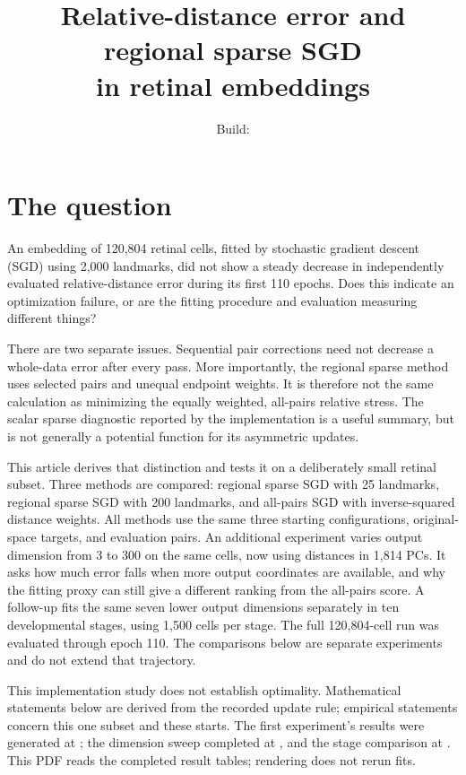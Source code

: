 \documentclass[11pt]{article}
\title{Relative-distance error and regional sparse SGD\\
in retinal embeddings}
\author{}
\date{Build: \reportbuilddatetime}
\begin{document}
\maketitle

\section{The question}
An embedding of 120,804 retinal cells, fitted by stochastic gradient descent
(SGD) using 2,000 landmarks, did not show a steady decrease in independently
evaluated relative-distance error during its first 110 epochs. Does this
indicate an optimization failure, or are the fitting procedure and evaluation
measuring different things?

There are two separate issues. Sequential pair corrections need not decrease a
whole-data error after every pass. More importantly, the regional sparse method
uses selected pairs and unequal endpoint weights. It is therefore not the same
calculation as minimizing the equally weighted, all-pairs relative stress.
The scalar sparse diagnostic reported by the implementation is a useful
summary, but is not generally a potential function for its asymmetric updates.

This article derives that distinction and tests it on a deliberately small
retinal subset. Three methods are compared: regional sparse SGD with 25
landmarks, regional sparse SGD with 200 landmarks, and all-pairs SGD with
inverse-squared distance weights. All methods use the same three starting
configurations, original-space targets, and evaluation pairs.
An additional experiment varies output dimension from 3 to 300 on the same
cells, now using distances in 1,814 PCs. It asks how much error falls when
more output coordinates are available, and why the fitting proxy can still
give a different ranking from the all-pairs score.
A follow-up fits the same seven lower output dimensions separately in ten
developmental stages, using 1,500 cells per stage.
The full 120,804-cell run was evaluated through epoch 110. The comparisons
below are separate experiments and do not extend that trajectory.

This implementation study does not establish optimality. Mathematical statements below
are derived from the recorded update rule; empirical statements concern this
one subset and these starts. The first experiment's results were generated
at \resultgenerated; the dimension sweep completed at \dimensiongenerated,
and the stage comparison at \stagegenerated.
This PDF reads the completed result tables; rendering does not rerun fits.
\end{document}
